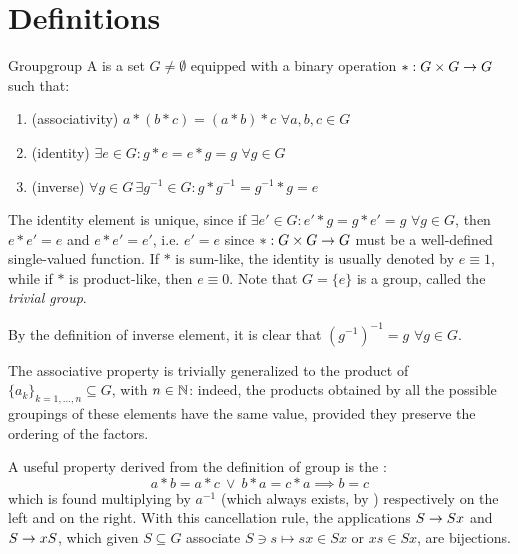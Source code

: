 
\section{Definitions}

\begin{definition}{Group}{group}
  A  is a set $ G \neq \emptyset $ equipped with a binary operation $ * : G \times G \rightarrow G $ such that:
  \begin{enumerate}
    \item (associativity) $ a * (b * c) = (a * b) * c \,\, \forall a,b,c \in G $
    \item (identity) $ \exists e \in G : g * e = e * g = g \,\, \forall g \in G $
    \item (inverse) $ \forall g \in G \, \exists g^{-1} \in G : g * g^{-1} = g^{-1} * g = e $
  \end{enumerate}
\end{definition}

The identity element is unique, since if $ \exists e' \in G : e' * g = g * e' = g \,\,\forall g \in G $, then $ e * e' = e $ and $ e * e' = e' $, i.e. $ e' = e $ since $ * : G \times G \rightarrow G $ must be a well-defined single-valued function. If $ * $ is sum-like, the identity is usually denoted by $ e \equiv 1 $, while if $ * $ is product-like, then $ e \equiv 0 $. Note that $ G = \{e\} $ is a group, called the \emph{trivial group}.

By the definition of inverse element, it is clear that $ (g^{-1})^{-1} = g \,\,\forall g \in G $.

The associative property is trivially generalized to the product of $ \{a_k\}_{k = 1, \dots, n} \subseteq G $, with $ n \in \mathbb{N} $: indeed, the products obtained by all the possible groupings of these elements have the same value, provided they preserve the ordering of the factors.

A useful property derived from the definition of group is the :
\begin{equation}
  a * b = a * c \ \lor \ b * a = c * a \implies b = c
\end{equation}
which is found multiplying by $ a^{-1} $ (which always exists, by ) respectively on the left and on the right. With this cancellation rule, the applications $ S \rightarrow S x $ and $ S \rightarrow x S $, which given $ S \subseteq G $ associate $ S \ni s \mapsto s x \in Sx $ or $ xs \in Sx $, are bijections.

